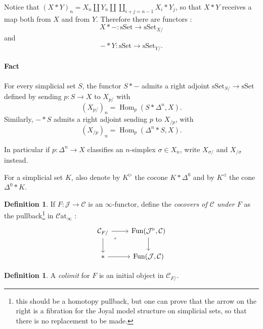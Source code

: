 \documentclass[11pt]{article}
\theoremstyle{definition}
\newtheorem{definition}[theorem]{Definition}
\newcommand{\C}{\mathcal{C}}
\newcommand{\Catinf}{\mathcal{C}\mathrm{at}_{\infty}}
\newcommand{\Fun}{\operatorname{Fun}}
\newcommand{\Hom}{\operatorname{Hom}}
\newcommand{\J}{\mathcal{J}}
\newcommand{\sSet}{\mathrm{sSet}}
\begin{document}
Notice that $(X \ast Y)_n = X_n \amalg Y_n \amalg \coprod_{i + j = n - 1} X_i \ast Y_j$, so that $X \ast Y$ receives a map both from $X$ and from $Y$. Therefore there are functors :
\[
    X \ast - : \sSet \to \sSet_{X/}
\]
and
\[
    - \ast Y : \sSet \to \sSet_{Y/}.
\]

\paragraph{Fact} For every simplicial set $S$, the functor $S \ast -$ admits a right adjoint $\sSet_{S/} \to \sSet$ defined by sending $p : S \to X$ to $X_{p/}$ with
\[
    (X_{p/})_n = \Hom_p(S \ast \Delta^n, X).
\]
Similarly, $- \ast S$ admits a right adjoint sending $p$ to $X_{/p}$, with
\[
    (X_{/p})_n = \Hom_p(\Delta^n \ast S, X).
\]

In particular if $p : \Delta^n \to X$ classifies an $n$-simplex $\sigma \in X_n$, write $X_{\sigma/}$ and $X_{/\sigma}$ instead.

For a simplicial set $K$, also denote by $K^{\triangleright}$ the cocone $K \ast \Delta^0$ and by $K^{\triangleleft}$ the cone $\Delta^0 \ast K$.

\begin{definition}
    If $F : \J \to \C$ is an $\infty$-functor, define the \emph{cocovers of $\C$ under $F$} as the pullback\footnote{this should be a homotopy pullback, but one can prove that the arrow on the right is a fibration for the Joyal model structure on simplicial sets, so that there is no replacement to be made.} in $\Catinf$ :
    \[\begin{tikzcd}
        {\C_{F/}} & {\Fun(\J^{\triangleright}, \C)} \\
        \ast & {\Fun(\J, \C)}
        \arrow[from=1-1, to=1-2]
        \arrow[from=1-1, to=2-1]
        \arrow["\lrcorner"{anchor=center, pos=0.125}, draw=none, from=1-1, to=2-2]
        \arrow[from=1-2, to=2-2]
        \arrow[from=2-1, to=2-2]
    \end{tikzcd}\]
\end{definition}

\begin{definition}
    A \emph{colimit} for $F$ is an initial object in $\C_{F/}$.
\end{definition}
\end{document}
